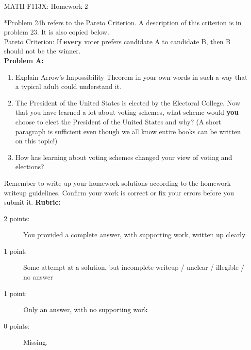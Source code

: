 \documentclass[11pt, oneside]{article}
\begin{document}
\begin{center} {\Large{MATH F113X: Homework 2}} \end{center}
\vspace{.3in}


*Problem 24b refers to the Pareto Criterion. A description of this criterion is in problem 23. It is also copied below.\\

Pareto Criterion:  If \textbf{every} voter prefers candidate A to candidate B, then B should not be the winner.\\

{\bf Problem A:}
\begin{enumerate}[(1)]
\item Explain Arrow's Impossibility Theorem in your own words in such a way that a typical adult could understand it. 

\item The President of the United States is elected by the Electoral College. Now that you have learned a lot about voting schemes, what scheme would \textbf{you} choose to elect the President of the United States and why? (A short paragraph is sufficient even though we all know entire books can be written on this topic!)

\item How has learning about voting schemes changed your view of voting and elections? \end{enumerate}
\vfill
Remember to write up your homework solutions according to the homework writeup guidelines. Confirm your work is correct or fix your errors before you submit it.
\vfill
\textbf{Rubric:}

\begin{description}
\item[2 points:] You provided a complete answer, with supporting work, written up clearly
\item[1 point:] Some attempt at a solution, but incomplete writeup / unclear / illegible / no answer
\item[1 point:] Only an answer, with no supporting work 
\item[0 points:] Missing.
\end{description}
\end{document}
